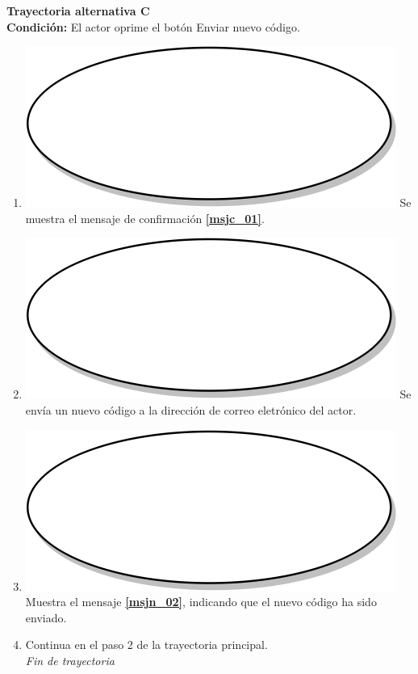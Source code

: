 \textbf{Trayectoria alternativa C} \label{cu2_1_ta_c} \\
\textbf{Condición:} El actor oprime el botón Enviar nuevo código.\\
 \begin{enumerate}[label=\arabic*]
    \item {\includegraphics[scale=.05]{Capitulo3/img/proceso.png} Se muestra el mensaje de confirmación \textbf{\ref{msjc_01}}.}
    \item {\includegraphics[scale=.05]{Capitulo3/img/proceso.png} Se envía un nuevo código a la dirección de correo eletrónico del actor.}
    \item {\includegraphics[scale=.05]{Capitulo3/img/proceso.png} Muestra el mensaje \textbf{\ref{msjn_02}}, indicando que el nuevo código ha sido enviado. }
    \item {Continua en el paso 2 de la trayectoria principal.} \\
    \textit{Fin de trayectoria} \\
\end{enumerate}